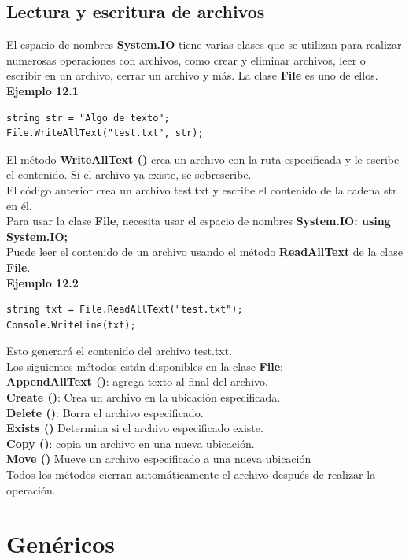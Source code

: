 \documentclass[12pt,a4paper]{report}
\begin{document}
\section{Lectura y escritura de archivos}
El espacio de nombres\textbf{ System.IO} tiene varias clases que se utilizan para realizar numerosas operaciones con archivos, como crear y eliminar archivos, leer o escribir en un archivo, cerrar un archivo y más.
La clase\textbf{ File} es uno de ellos.\\\textbf{Ejemplo 12.1}
\begin{lstlisting}
string str = "Algo de texto";
File.WriteAllText("test.txt", str);
\end{lstlisting}El método\textbf{ WriteAllText ()} crea un archivo con la ruta especificada y le escribe el contenido. Si el archivo ya existe, se sobrescribe.\\El código anterior crea un archivo test.txt y escribe el contenido de la cadena str en él.\\Para usar la clase\textbf{ File}, necesita usar el espacio de nombres \textbf{System.IO: using System.IO;}\\Puede leer el contenido de un archivo usando el método\textbf{ ReadAllText} de la clase\textbf{ File}.\\\textbf{Ejemplo 12.2}
\begin{lstlisting}
string txt = File.ReadAllText("test.txt");
Console.WriteLine(txt); 
\end{lstlisting}Esto generará el contenido del archivo test.txt.\\Los siguientes métodos están disponibles en la clase \textbf{File}:\\\textbf{ AppendAllText ()}: agrega texto al final del archivo.\\\textbf{ Create ()}: Crea un archivo en la ubicación especificada.\\\textbf{ Delete ()}: Borra el archivo especificado.\\\textbf{Exists ()} Determina si el archivo especificado existe.\\\textbf{Copy ()}: copia un archivo en una nueva ubicación.\\\textbf{Move ()} Mueve un archivo especificado a una nueva ubicación\\Todos los métodos cierran automáticamente el archivo después de realizar la operación.
\chapter{Genéricos}
\end{document}
